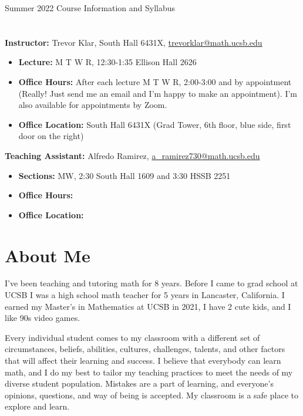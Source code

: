 \documentclass[11pt,letterpaper]{article}
\begin{document}
\thispagestyle{fancy}
\begin{center}
{\Large Summer 2022 Course Information and Syllabus} 
\end{center}

\section*{}
\textbf{Instructor:} Trevor Klar, South Hall 6431X, \href{mailto:trevorklar@math.ucsb.edu}{trevorklar@math.ucsb.edu} 
\begin{itemize}[nosep]
\item \textbf{Lecture:} M T W R, 12:30-1:35 Ellison Hall 2626 
\item \textbf{Office Hours:} After each lecture M T W R, 2:00-3:00 and by appointment (Really! Just send me an email and I'm happy to make an appointment). I'm also available for appointments by Zoom. 
\item \textbf{Office Location:} South Hall 6431X (Grad Tower, 6th floor, blue side, first door on the right)
\end{itemize}
\noindent \textbf{Teaching Assistant:} Alfredo Ramirez, \href{mailto:a_ramirez730@math.ucsb.edu}{a\_ramirez730@math.ucsb.edu}
\begin{itemize}[nosep]
\item \textbf{Sections:} MW, 2:30 South Hall 1609 and 3:30 HSSB 2251
\item \textbf{Office Hours:} 
\item \textbf{Office Location:} 
\end{itemize}

\section*{About Me}
I've been teaching and tutoring math for 8 years. Before I came to grad school at UCSB I was a high school math teacher for 5 years in Lancaster, California. I earned my Master's in Mathematics at UCSB in 2021, I have 2 cute kids, and I like 90s video games. 

Every individual student comes to my classroom with a different set of circumstances, beliefs, abilities, cultures, challenges, talents, and other factors that will affect their learning and success. I believe that everybody can learn math, and I do my best to tailor my teaching practices to meet the needs of my diverse student population. Mistakes are a part of learning, and everyone's opinions, questions, and way of being is accepted. My classroom is a safe place to explore and learn. 
\end{document}
